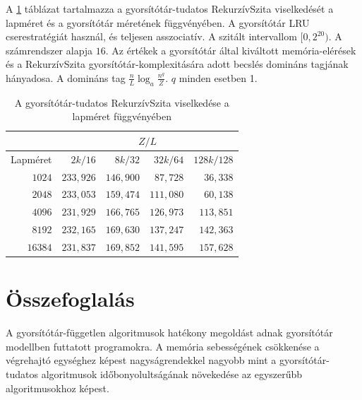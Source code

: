 \documentclass[12pt]{report}
\begin{document}
A \ref{table-bucket-sieve-aware} táblázat tartalmazza
a gyorsítótár-tudatos RekurzívSzita viselkedését
a lapméret és a gyorsítótár méretének függvényében.
A gyorsítótár LRU cserestratégiát használ,
és teljesen asszociatív.
A szitált intervallom $[0, 2^{20})$.
A számrendszer alapja $16$.
Az értékek a gyorsítótár által kiváltott memória-elérések
és a RekurzívSzita gyorsítótár-komplexitására adott becslés domináns tagjának
hányadosa.
A domináns tag $\frac{n}{L} \log_{a}{\frac{n^q}{Z}}$.
$q$ minden esetben 1.

\begin{table}[ht]
\centering
\caption{A gyorsítótár-tudatos RekurzívSzita viselkedése a lapméret függvényében}
\label{table-bucket-sieve-aware}
\begin{tabular}{|r|r|r|r|r|}
\hline
 & \multicolumn{4}{|c|}{$Z/L$} \\
\hline
Lapméret & $2k/16$ & $8k/32$ & $32k/64$ & $128k/128$ \\
\hline
 $1024$ & $233,926$ & $146,900$ &  $87,728$ &  $36,338$ \\
\hline
 $2048$ & $233,053$ & $159,474$ & $111,080$ &  $60,138$ \\
\hline
 $4096$ & $231,929$ & $166,765$ & $126,973$ & $113,851$ \\
\hline
 $8192$ & $232,165$ & $169,630$ & $137,247$ & $142,363$ \\
\hline
$16384$ & $231,837$ & $169,852$ & $141,595$ & $157,628$ \\
\hline
\end{tabular}
\end{table}

\chapter{Összefoglalás}

A gyorsítótár-független algoritmusok hatékony megoldást
adnak gyorsítótár modellben futtatott programokra.
A memória sebességének csökkenése a végrehajtó egységhez képest
nagyságrendekkel nagyobb mint a gyorsítótár-tudatos algoritmusok
időbonyolultságának növekedése az egyszerűbb algoritmusokhoz képest.
\end{document}
